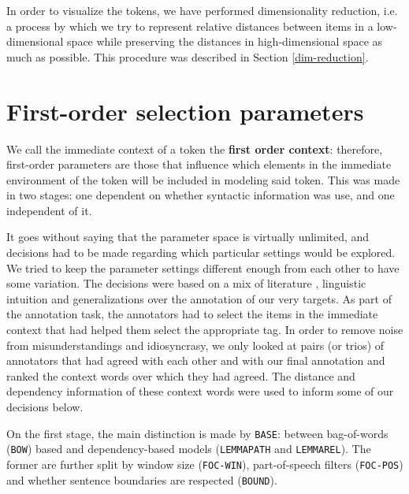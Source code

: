 \documentclass[
]{book}
\begin{document}
In order to visualize the tokens, we have performed dimensionality reduction, i.e.
a process by which we try to represent relative distances between items in a low-dimensional space
while preserving the distances in high-dimensional space as much as possible.
This procedure was described in Section \ref{dim-reduction}.

\hypertarget{first-order-selection-parameters}{%
\section{First-order selection parameters}\label{first-order-selection-parameters}}

We call the immediate context of a token the \textbf{first order context}: therefore,
first-order parameters are those that influence which elements in the immediate environment
of the token will be included in modeling said token. This was made in two stages:
one dependent on whether syntactic information was use, and one independent of it.

It goes without saying that the parameter space is virtually unlimited, and decisions
had to be made regarding which particular settings would be explored. We tried to
keep the parameter settings different enough from each other to have some variation.
The decisions were based on a mix of literature \autocite{kiela.clark_2014},
linguistic intuition and generalizations over the annotation of our very targets.
As part of the annotation task, the annotators had to select the items in the
immediate context that had helped them select the appropriate tag. In order to remove
noise from misunderstandings and idiosyncrasy, we only looked at pairs (or trios) of
annotators that had agreed with each other and with our final annotation and ranked
the context words over which they had agreed. The distance and dependency information
of these context words were used to inform some of our decisions below.

On the first stage, the main distinction is made by \texttt{BASE}: between bag-of-words (\texttt{BOW}) based
and dependency-based models (\texttt{LEMMAPATH} and \texttt{LEMMAREL}).
The former are further split by window size (\texttt{FOC-WIN}), part-of-speech filters (\texttt{FOC-POS})
and whether sentence boundaries are respected (\texttt{BOUND}).
\end{document}
